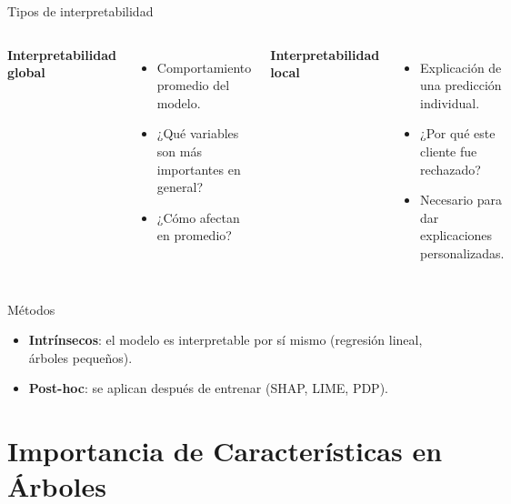 \documentclass[aspectratio=169, 10pt, xcolor=table]{beamer}
\begin{document}
\begin{frame}{Tipos de interpretabilidad}
    \begin{columns}[t]
        \textbf{Interpretabilidad global}
        \begin{itemize}
            \item Comportamiento promedio del modelo.
            \item ¿Qué variables son más importantes en general?
            \item ¿Cómo afectan en promedio?
        \end{itemize}
        \textbf{Interpretabilidad local}
        \begin{itemize}
            \item Explicación de una predicción individual.
            \item ¿Por qué este cliente fue rechazado?
            \item Necesario para dar explicaciones personalizadas.
        \end{itemize}
    \end{columns}
    \vspace{0.3cm}
    \begin{block}{Métodos}
        \begin{itemize}
            \item \textbf{Intrínsecos}: el modelo es interpretable por sí mismo (regresión lineal, árboles pequeños).
            \item \textbf{Post-hoc}: se aplican después de entrenar (SHAP, LIME, PDP).
        \end{itemize}
    \end{block}
\end{frame}

\section{Importancia de Características en Árboles}
\end{document}
